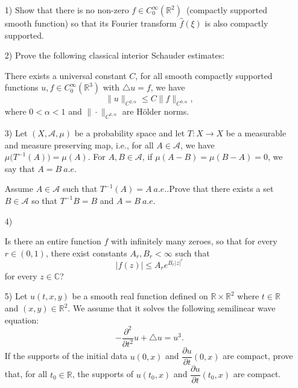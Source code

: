 \documentclass[10pt]{article}
\renewcommand{\leq}{\leqslant}
\begin{document}
\begin{enumerate}
\item [1)]
Show that there is no non-zero $f \in C_0^\infty(\mathbb{R}^2)$~(compactly supported smooth function) so that its Fourier transform $\widehat{f}(\xi)$ is also compactly supported.


\item[2)]
Prove the following classical interior Schauder estimates:

There exists a universal constant $C$, for all smooth compactly supported functions $u, f\in C_0^\infty(\mathbb{R}^3)$ with $\triangle u =f$, we have
\[\|u\|_{C^{2,\alpha}} \leq C \|f\|_{C^{0,\alpha}} ,\]
where $0<\alpha<1$ and $\|\cdot\|_{C^{k,\alpha}}$ are H\"{o}lder norms.

\item[3)]
Let $(X,\mathcal{A},\mu)$ be a probability space and let $T:X\rightarrow X$ be a measurable and measure preserving map, i.e., for all $A\in \mathcal{A}$, we have $\mu\big(T^{-1}(A)\big)=\mu(A)$. For $A,B \in \mathcal{A}$, if $\mu(A-B)=\mu(B-A)=0$, we say that $A=B ~a.e.$

Assume $A\in \mathcal{A}$ such that $T^{-1}(A)=A~a.e.$.Prove that there exists a set $B \in \mathcal{A}$ so that $T^{-1}B=B$ and $A=B~a.e.$

\item[4)]

Is there an entire function $f$ with infinitely many zeroes, so that for every $r \in (0,1)$, there exist constants $A_r, B_r < \infty$ such that $$|f(z)| \leq A_r e^{B_r |z|^r}$$ for every $z \in \mathbb{C}$?


\item[5)]Let $u(t,x,y)$ be a smooth real function defined on $\mathbb{R}\times \mathbb{R}^2$ where $t\in \mathbb{R}$ and $(x,y)\in \mathbb{R}^2$. We assume that it solves the following semilinear wave equation:
\[-\frac{\partial^2}{\partial t^2}u+\triangle u = u^3.\]
If the supports of the initial data $u(0,x)$ and $\dfrac{\partial u}{\partial t}(0,x)$ are compact, prove that, for all $t_0\in \mathbb{R}$, the supports of  $u(t_0,x)$ and $\dfrac{\partial u}{\partial t}(t_0,x)$ are compact.




\end{enumerate}
\end{document}

